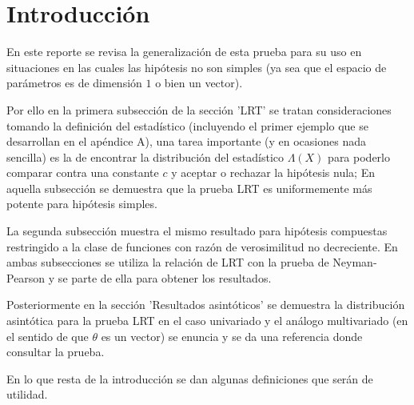 \documentclass[peerreview]{IEEEtran}
\begin{document}
\section{Introducción}

En este reporte se revisa la generalización de esta prueba para su uso en situaciones en las cuales las hipótesis no son simples (ya sea que el espacio de parámetros es de dimensión $1$ o bien un vector). %

Por ello en la primera subsección de la sección 'LRT' se tratan consideraciones tomando la definición del estadístico (incluyendo el primer ejemplo que se desarrollan en el apéndice A), una tarea importante (y en ocasiones nada sencilla) es la de encontrar la distribución del estadístico $\Lambda(X)$ para poderlo comparar contra una constante $c$ y aceptar o rechazar la hipótesis nula; En aquella subsección se demuestra que la prueba LRT es uniformemente más potente para hipótesis simples. 

La segunda subsección muestra el mismo resultado para hipótesis compuestas restringido a la clase de funciones con razón de verosimilitud no decreciente. En ambas subsecciones se utiliza la relación de LRT con la prueba de Neyman-Pearson y se parte de ella para obtener los resultados.

Posteriormente en la sección 'Resultados asintóticos' se demuestra la distribución asintótica para la prueba LRT en el caso univariado y el análogo multivariado (en el sentido de que $\theta$ es un vector) se enuncia y se da una referencia donde consultar la prueba.

En lo que resta de la introducción se dan algunas definiciones que serán de utilidad.
\end{document}
